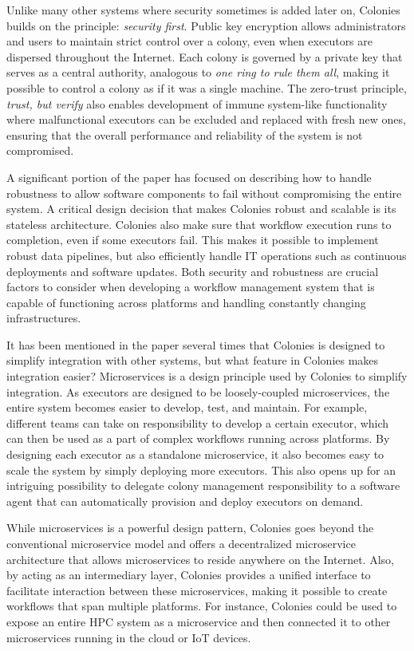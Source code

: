 \documentclass{article}
\begin{document}
Unlike many other systems where security sometimes is added later on, Colonies builds on the principle: \emph{security first}. Public key encryption allows administrators and users to maintain strict control over a colony, even when executors are dispersed throughout the Internet. Each colony is governed by a private key that serves as a central authority, analogous to \emph{one ring to rule them all}, making it possible to control a colony as if it was a single machine. The zero-trust principle, \emph{trust, but verify} also enables development of immune system-like functionality where malfunctional executors can be excluded and replaced with fresh new ones, ensuring that the overall performance and reliability of the system is not compromised. 

A significant portion of the paper has focused on describing how to handle robustness to allow software components to fail without compromising the entire system. A critical design decision that makes Colonies robust and scalable is its stateless architecture. Colonies also make sure that workflow execution runs to completion, even if some executors fail. This makes it possible to implement robust data pipelines, but also efficiently handle IT operations such as continuous deployments and software updates. Both security and robustness are crucial factors to consider when developing a workflow management system that is capable of functioning across platforms and handling constantly changing infrastructures. 

It has been mentioned in the paper several times that Colonies is designed to simplify integration with other systems, but what feature in Colonies makes integration easier? Microservices is a design principle used by Colonies to simplify integration. As executors are designed to be loosely-coupled microservices, the entire system becomes easier to develop, test, and maintain. For example, different teams can take on responsibility to develop a certain executor, which can then be used as a part of complex workflows running across platforms. By designing each executor as a standalone microservice, it also becomes easy to scale the system by simply deploying more executors. This also opens up for an intriguing possibility to delegate colony management responsibility to a software agent that can automatically provision and deploy executors on demand.

While microservices is a powerful design pattern, Colonies goes beyond the conventional microservice model and offers a decentralized microservice architecture that allows microservices to reside anywhere on the Internet. Also, by acting as an intermediary layer, Colonies provides a unified interface to facilitate interaction between these microservices, making it possible to create workflows that span multiple platforms. For instance, Colonies could be used to expose an entire HPC system as a microservice and then connected it to other microservices running in the cloud or IoT devices. 
\end{document}
